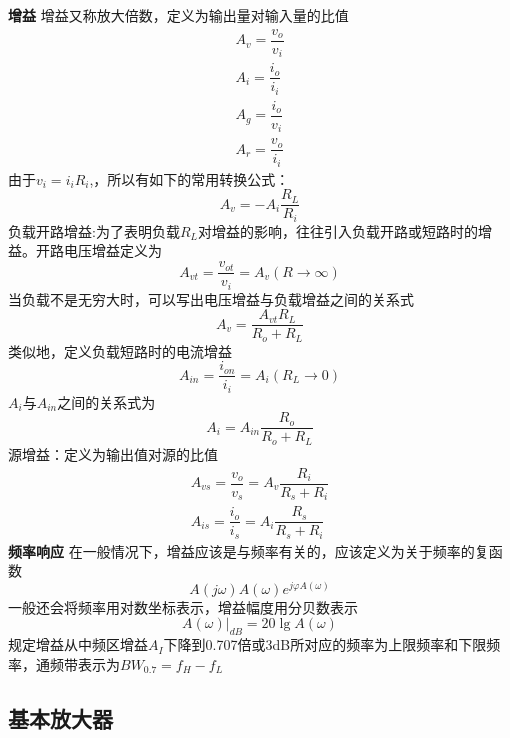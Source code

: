 \documentclass{ctexart}
\newcommand*{\noindbfquad}[1]{{\noindent \bf{#1} \qquad}}
\newcommand*{\noindbfline}[1]{{\noindent \bf{#1} \newline}}
\begin{document}
\noindbfline{增益}
增益又称放大倍数，定义为输出量对输入量的比值
\begin{align}
    A_v=\dfrac{v_o}{v_i}\\
    A_i=\dfrac{i_o}{i_i}\\
    A_g=\dfrac{i_o}{v_i}\\
    A_r=\dfrac{v_o}{i_i}
\end{align}
由于$v_i=i_iR_i$,{\color{red}{$v_o=-i_oR_L$}}，所以有如下的常用转换公式：
\begin{equation}
    A_v=-A_i\dfrac{R_L}{R_i}
\end{equation}
负载开路增益:为了表明负载$R_L$对增益的影响，往往引入负载开路或短路时的增益。开路电压增益定义为
\begin{equation}
    A_{vt}=\dfrac{v_{ot}}{v_i}=A_v(R\rightarrow \infty)
\end{equation}
当负载不是无穷大时，可以写出电压增益与负载增益之间的关系式
\begin{equation}
    A_v=\dfrac{A_{vt}R_L}{R_o+R_L}
\end{equation}
类似地，定义负载短路时的电流增益
\begin{equation}
    A_{in}=\dfrac{i_{on}}{i_i}=A_i(R_L\rightarrow 0)
\end{equation}
$A_i$与$A_{in}$之间的关系式为
\begin{equation}
    A_i=A_{in}\dfrac{R_o}{R_o+R_L}
\end{equation}
源增益：定义为输出值对源的比值
\begin{align}
    A_{vs}=\dfrac{v_o}{v_s}=A_v\dfrac{R_i}{R_s+R_i}\\
    A_{is}=\dfrac{i_o}{i_s}=A_i\dfrac{R_s}{R_s+R_i}
\end{align}
{\color{red}{在讨论电压比值时，总是默认激励源的电阻是与理想电压源串联的，在讨论电流时，总是默认并联的}}
\noindbfquad{频率响应}在一般情况下，增益应该是与频率有关的，应该定义为关于频率的复函数\
\begin{equation}
    A(j\omega)A(\omega)e^{j\varphi A(\omega)}
\end{equation}
一般还会将频率用对数坐标表示，增益幅度用分贝数表示
\begin{equation}
    A(\omega)|_{dB}=20\lg A(\omega)
\end{equation}
规定增益从中频区增益$A_I$下降到0.707倍或3dB所对应的频率为上限频率和下限频率，通频带表示为$BW_{0.7}=f_H-f_L$
\subsection{基本放大器}
\end{document}
